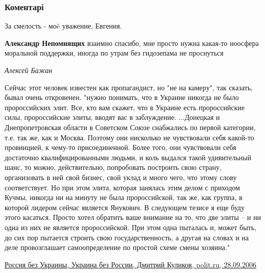  
 
 
 
 
\subsubsection{Коментарі}

\begin{itemize} %
За смелость - моë уважение, Евгения.

\begin{itemize} %
\textbf{Александр Непомнящих} взаимно спасибо, мне просто нужна какая-то ноосфера моральной поддержки, иногда по утрам без гидозепама не проснуться
\end{itemize} %

\emph{Алексей Бажан}

Сейчас этот человек известен как пропагандист, но "не на камеру", так сказать,
бывал очень откровенен. "нужно понимать, что в Украине никогда не было
пророссийских элит. Все, кто вам скажет, что в Украине есть пророссийские силы,
пророссийские элиты, вводят вас в заблуждение. ...Донецкая и Днепропетровская
области в Советском Союзе снабжались по первой категории, т.е. так же, как и
Москва. Поэтому они нисколько не чувствовали себя какой-то провинцией, к
чему-то присоединенной. Более того, они чувствовали себя достаточно
квалифицированными людьми, и коль выдался такой удивительный шанс, то можно,
действительно, попробовать построить свою страну, организовать в ней свой
бизнес, свой уклад и много чего, что этому слову соответствует. Но при этом
элита, которая занялась этим делом с приходом Кучмы, никогда ни на минуту не
была пророссийской, так же, как группа, в которой лидером сейчас является
Янукович. В следующем тезисе я еще буду этого касаться. Просто хотел обратить
ваше внимание на то, что две элиты – и ни одна из них не является
пророссийской. При этом одна пыталась и, может быть, до сих пор пытается
строить свою государственность, а другая на словах и на деле провозглашает
самоопределение по простой схеме смены хозяина."

\href{https://polit.ru/article/2006/09/28/kulikov/}{%
Россия без Украины, Украина без России, Дмитрий Куликов, polit.ru, 28.09.2006
}


\end{itemize}

